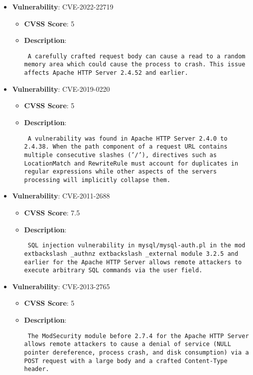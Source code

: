 \documentclass{article}
\begin{document}
\begin{itemize}
        \item \textbf{Vulnerability}: CVE-2022-22719
        \begin{itemize}
            \item \textbf{CVSS Score}:  5 
            \item \textbf{Description}: \parbox{\linewidth}{\texttt{ A carefully crafted request body can cause a read to a random memory area which could cause the process to crash. This issue affects Apache HTTP Server 2.4.52 and earlier. }}
        \end{itemize}
    
        \item \textbf{Vulnerability}: CVE-2019-0220
        \begin{itemize}
            \item \textbf{CVSS Score}:  5 
            \item \textbf{Description}: \parbox{\linewidth}{\texttt{ A vulnerability was found in Apache HTTP Server 2.4.0 to 2.4.38. When the path component of a request URL contains multiple consecutive slashes ('/'), directives such as LocationMatch and RewriteRule must account for duplicates in regular expressions while other aspects of the servers processing will implicitly collapse them. }}
        \end{itemize}
    
        \item \textbf{Vulnerability}: CVE-2011-2688
        \begin{itemize}
            \item \textbf{CVSS Score}:  7.5 
            \item \textbf{Description}: \parbox{\linewidth}{\texttt{ SQL injection vulnerability in mysql/mysql-auth.pl in the mod	extbackslash _authnz	extbackslash _external module 3.2.5 and earlier for the Apache HTTP Server allows remote attackers to execute arbitrary SQL commands via the user field. }}
        \end{itemize}
    
        \item \textbf{Vulnerability}: CVE-2013-2765
        \begin{itemize}
            \item \textbf{CVSS Score}:  5 
            \item \textbf{Description}: \parbox{\linewidth}{\texttt{ The ModSecurity module before 2.7.4 for the Apache HTTP Server allows remote attackers to cause a denial of service (NULL pointer dereference, process crash, and disk consumption) via a POST request with a large body and a crafted Content-Type header. }}
        \end{itemize}
    

\end{itemize}
\end{document}
